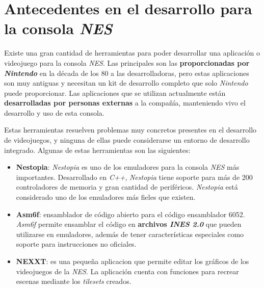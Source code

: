 \section{Antecedentes en el desarrollo para la consola \textit{NES}}
\label{sec:antecedentes-en-el-desarrollo-para-la-consola-nes}

Existe una gran cantidad de herramientas para poder desarrollar
una aplicación o videojuego para la consola \textit{NES}\cite{NES}.
Las principales son las \textbf{proporcionadas por \textit{Nintendo}}
en la década de los 80 a las desarrolladoras, pero estas
aplicaciones son muy antiguas y necesitan un kit de desarrollo
completo que solo \textit{Nintendo} puede proporcionar.
Las aplicaciones que se utilizan actualmente están
\textbf{desarrolladas por personas externas} a la compañía,
manteniendo vivo el desarrollo y uso de esta consola.

Estas herramientas resuelven problemas muy concretos
presentes en el desarrollo de videojuegos, y ninguna
de ellas puede considerarse un entorno de desarrollo integrado.
Algunas de estas herramientas son las siguientes:

\begin{itemize}
    \item \textbf{Nestopia}\cite{NESTOPIA}:
    \textit{Nestopia} es uno de los emuladores
    para la consola \textit{NES} más importantes.
    Desarrollado en \textit{C++}, \textit{Nestopia} tiene soporte
    para más de 200 controladores de memoria y gran cantidad de periféricos.
    \emph{Nestopia} está considerado uno de los emuladores más
    fieles que existen.
    \item \textbf{Asm6f}\cite{ASM6F}:
    ensamblador de código abierto
    para el código ensamblador 6052.
    \textit{Asm6f} permite ensamblar el código en
    \textbf{archivos \textit{INES 2.0}}
    que pueden utilizarse en emuladores, además
    de tener características especiales como soporte
    para instrucciones no oficiales.
    \item \textbf{NEXXT}: es una pequeña
    aplicacion que permite editar los gráficos de los
    videojuegos de la \textit{NES}.
    La aplicación cuenta con funciones para recrear escenas
    mediante los \textit{tilesets} creados.
\end{itemize}
